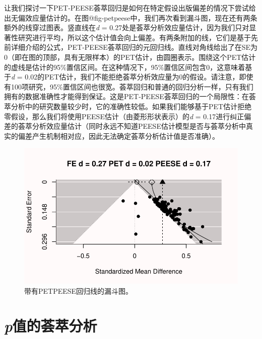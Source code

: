 \documentclass[
  letterpaper,
  DIV=11,
  numbers=noendperiod]{scrreprt}
\begin{document}
让我们探讨一下PET-PEESE荟萃回归是如何在特定假设出版偏差的情况下尝试给出无偏效应量估计的。在图@fig-petpeese中，我们再次看到漏斗图，现在还有两条额外的线穿过图表。竖直线在\emph{d}
=
0.27处是荟萃分析效应量估计，因为我们只对显著性研究进行平均，所以这个估计值会向上偏差。有两条附加的线，它们是基于先前详细介绍的公式，PET-PEESE荟萃回归的元回归线。直线对角线给出了在SE为0（即在图的顶部，具有无限样本）的PET估计，由圆圈表示。围绕这个PET估计的虚线是估计的95\%置信区间。在这种情况下，95\%置信区间包含0，这意味着基于\emph{d}
=
0.02的PET估计，我们不能拒绝荟萃分析效应量为0的假设。请注意，即使有100项研究，95\%置信区间也很宽。荟萃回归和普通的回归分析一样，只有我们拥有的数据准确性才能得到保证。这是PET-PEESE荟萃回归的一个局限性：在荟萃分析中的研究数量较少时，它的准确性较低。如果我们能够基于PET估计拒绝零假设，那么我们将使用PEESE估计（由菱形形状表示）的\emph{d}
=
0.17进行纠正偏差的荟萃分析效应量估计（同时永远不知道PEESE估计模型是否与荟萃分析中真实的偏差产生机制相对应，因此无法确定荟萃分析估计值是否准确）。

\begin{figure}

{\centering \includegraphics[width=1\textwidth,height=\textheight]{12-bias_files/figure-pdf/fig-petpeese-1.pdf}

}

\caption{\label{fig-petpeese}带有PETPEESE回归线的漏斗图。}

\end{figure}

\hypertarget{pux503cux7684ux835fux8403ux5206ux6790}{%
\section{\texorpdfstring{\emph{p}值的荟萃分析}{p值的荟萃分析}}\label{pux503cux7684ux835fux8403ux5206ux6790}}
\end{document}
